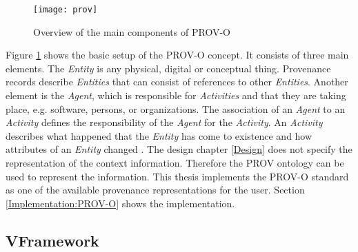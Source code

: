 \documentclass[draft,final]{vutinfth} %
\newcommand{\bgoesswein}[1]{{\color{blue}#1}}
\begin{document}
\begin{figure}[h]
	\centering
	\texttt{[image: prov]}
	\caption{Overview of the main components of PROV-O \cite{733f89c65e4844f9aabcae1c276a5602}}
	\label{fig:prov} %
\end{figure}

Figure \ref{fig:prov} shows the basic setup of the PROV-O concept. It consists of three main elements. The \textit{Entity} is any physical, digital or conceptual thing. Provenance records describe \textit{Entities} that can consist of references to other \textit{Entities}. Another element is the \textit{Agent}, which is responsible for \textit{Activities} and that they are taking place, e.g. software, persons, or organizations. The association of an \textit{Agent} to an \textit{Activity} defines the responsibility of the \textit{Agent} for the \textit{Activity}. An \textit{Activity} describes what happened that the \textit{Entity} has come to existence and how attributes of an \textit{Entity} changed \cite{733f89c65e4844f9aabcae1c276a5602}. The design chapter \ref{Design} does not specify the representation of the context information. Therefore the PROV ontology can be used to represent the information. \bgoesswein{This thesis implements the PROV-O standard as one of the available provenance representations for the user. Section \ref{Implementation:PROV-O} shows the implementation.}
\subsection{VFramework}\label{vframework}
\end{document}
